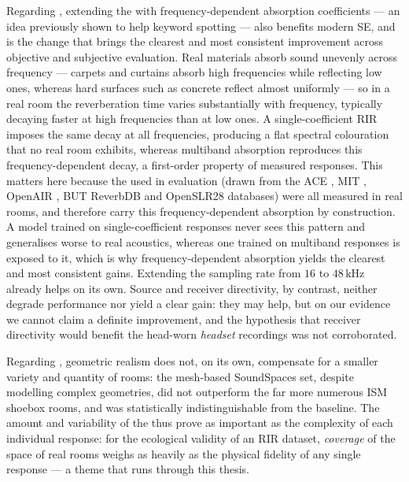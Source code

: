 Regarding , extending the  with
frequency-dependent absorption coefficients --- an idea previously shown to help
keyword spotting --- also benefits modern \acrshort{SE}, and is the change that
brings the clearest and most consistent improvement across objective and
subjective evaluation. Real materials absorb sound unevenly across frequency ---
carpets and curtains absorb high frequencies while reflecting low ones, whereas
hard surfaces such as concrete reflect almost uniformly --- so in a real room the
reverberation time varies substantially with frequency, typically decaying faster
at high frequencies than at low ones. A single-coefficient \acrshort{RIR} imposes
the same decay at all frequencies, producing a flat spectral colouration that no
real room exhibits, whereas multiband absorption reproduces this
frequency-dependent decay, a first-order property of measured responses. This
matters here because the  used in evaluation (drawn from the
ACE \citep{eaton2015ace}, MIT \citep{traer2016statistics}, OpenAIR
\citep{murphy2010openair}, BUT ReverbDB \citep{szoke2019building} and OpenSLR28
\citep{ko2017study} databases) were all measured in real rooms, and therefore
carry this frequency-dependent absorption by construction. A model trained on
single-coefficient responses never sees this pattern and generalises worse to
real acoustics, whereas one trained on multiband responses is exposed to it,
which is why frequency-dependent absorption yields the clearest and most
consistent gains. Extending the sampling rate from $16$ to $48\,\text{kHz}$
already helps on its own. Source and receiver directivity, by contrast, neither
degrade performance nor yield a clear gain: they may help, but on our evidence
we cannot claim a definite improvement, and the hypothesis that receiver
directivity would benefit the head-worn \emph{headset} recordings was not corroborated.

Regarding , geometric realism does not, on its own, compensate for a
smaller variety and quantity of rooms: the mesh-based SoundSpaces set, despite
modelling complex geometries, did not outperform the far more numerous
\acrshort{ISM} shoebox rooms, and was statistically indistinguishable from the
baseline. The amount and variability of the  thus prove as
important as the complexity of each individual response: for the ecological
validity of an \acrshort{RIR} dataset, \emph{coverage} of the space of real rooms
weighs as heavily as the physical fidelity of any single response --- a theme
that runs through this thesis.

